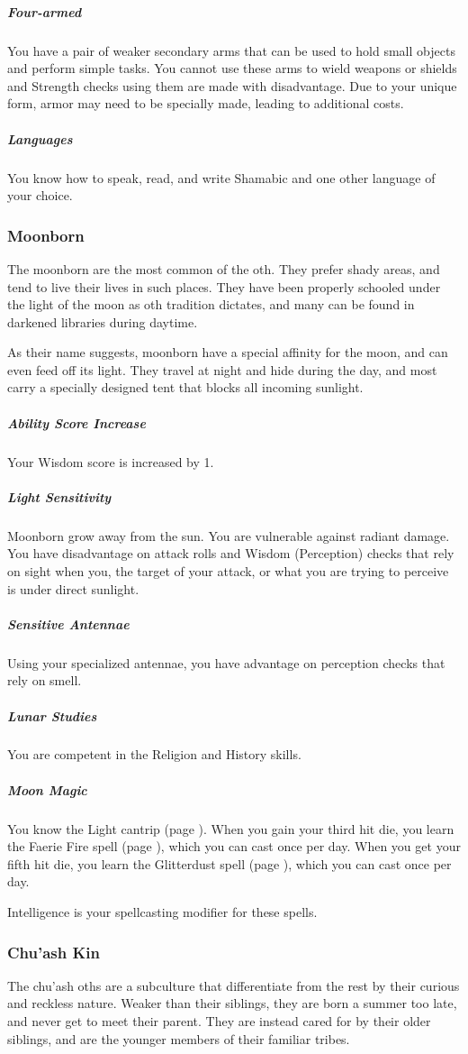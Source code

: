 \begin{linenumbers}
\subparagraph{Four-armed} You have a pair of weaker secondary arms that can be used to hold small objects and perform simple tasks.
You cannot use these arms to wield weapons or shields and Strength checks using them are made with disadvantage.
Due to your unique form, armor may need to be specially made, leading to additional costs.

\subparagraph{Languages} You know how to speak, read, and write Shamabic and one other language of your choice.

\subsubsection{Moonborn}
The moonborn are the most common of the oth.
They prefer shady areas, and tend to live their lives in such places.
They have been properly schooled under the light of the moon as oth tradition dictates, and many can be found in darkened libraries during daytime.

As their name suggests, moonborn have a special affinity for the moon, and can even feed off its light.
They travel at night and hide during the day, and most carry a specially designed tent that blocks all incoming sunlight.

\subparagraph{Ability Score Increase} Your Wisdom score is increased by 1.

\subparagraph{Light Sensitivity} Moonborn grow away from the sun.
You are vulnerable against radiant damage.
You have disadvantage on attack rolls and Wisdom (Perception) checks that rely on sight when you, the target of your attack, or what you are trying to perceive is under direct sunlight.

\subparagraph{Sensitive Antennae} Using your specialized antennae, you have advantage on perception checks that rely on smell.

\subparagraph{Lunar Studies} You are competent in the Religion and History skills.

\subparagraph{Moon Magic} You know the Light cantrip (page \pageref{spell::light}).
When you gain your third hit die, you learn the Faerie Fire spell (page \pageref{spell::faeriefire}), which you can cast once per day.
When you get your fifth hit die, you learn the Glitterdust spell (page \pageref{spell::glitterdust}), which you can cast once per day.

Intelligence is your spellcasting modifier for these spells.

\subsubsection{Chu'ash Kin}
The chu'ash oths are a subculture that differentiate from the rest by their curious and reckless nature.
Weaker than their siblings, they are born a summer too late, and never get to meet their parent.
They are instead cared for by their older siblings, and are the younger members of their familiar tribes.


\end{linenumbers}
